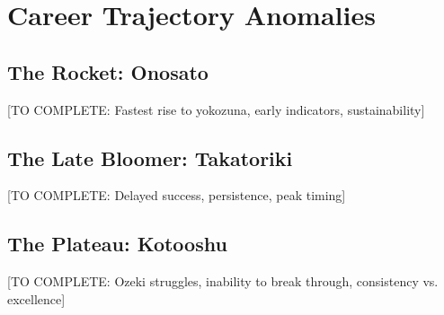 \section{Career Trajectory Anomalies}

\subsection{The Rocket: Onosato}

[TO COMPLETE: Fastest rise to yokozuna, early indicators, sustainability]

\subsection{The Late Bloomer: Takatoriki}

[TO COMPLETE: Delayed success, persistence, peak timing]

\subsection{The Plateau: Kotooshu}

[TO COMPLETE: Ozeki struggles, inability to break through, consistency vs. excellence]